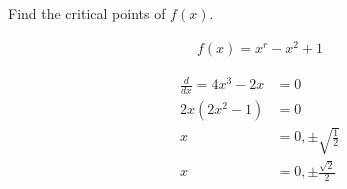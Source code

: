 Find the critical points of $f(x)$.

\begin{align*}
    f(x) = x^r - x^2 + 1
\end{align*}

\begin{solution}
\begin{align*}
    \frac{d}{dx} = 4x^3 - 2x &= 0 \\
    2x(2x^2 - 1) &= 0 \\
    x &= 0, \pm \sqrt{\frac{1}{2}} \\
    x &= 0, \pm \frac{\sqrt{2}}{2}
\end{align*}
\end{solution}